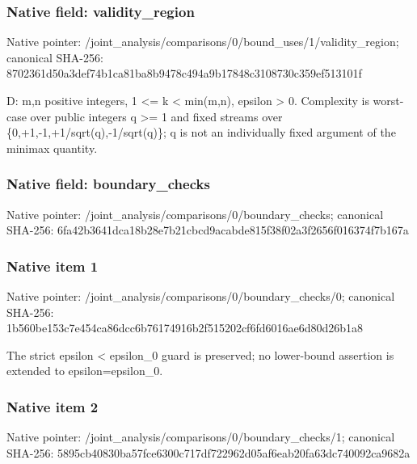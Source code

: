 \documentclass[10pt,a4paper]{article}
\begin{document}
\subsubsection{Native field: validity\_\allowbreak{}region}
Native pointer: /joint\_\allowbreak{}analysis/comparisons/0/bound\_\allowbreak{}uses/1/validity\_\allowbreak{}region; canonical SHA-256: 8702361d50a3def74b1ca81ba8b9478c494a9b17848c3108730c359ef513101f

\begingroup\raggedright\sloppy D:\allowbreak{} m,\allowbreak{}n positive integers,\allowbreak{} 1 <=\allowbreak{} k < min(m,\allowbreak{}n),\allowbreak{} epsilon > 0. Complexity is worst-case over public integers q >=\allowbreak{} 1 and fixed streams over \{0,\allowbreak{}+1,\allowbreak{}-1,\allowbreak{}+1/\allowbreak{}sqrt(q),\allowbreak{}-1/\allowbreak{}sqrt(q)\};\allowbreak{} q is not an individually fixed argument of the minimax quantity.\par\endgroup

\subsubsection{Native field: boundary\_\allowbreak{}checks}
Native pointer: /joint\_\allowbreak{}analysis/comparisons/0/boundary\_\allowbreak{}checks; canonical SHA-256: 6fa42b3641dca18b28e7b21cbcd9acabde815f38f02a3f2656f016374f7b167a

\subsubsection{Native item 1}
Native pointer: /joint\_\allowbreak{}analysis/comparisons/0/boundary\_\allowbreak{}checks/0; canonical SHA-256: 1b560be153c7e454ca86dcc6b76174916b2f515202cf6fd6016ae6d80d26b1a8

\begingroup\raggedright\sloppy The strict epsilon < epsilon\_\allowbreak{}0 guard is preserved;\allowbreak{} no lower-bound assertion is extended to epsilon=\allowbreak{}epsilon\_\allowbreak{}0.\par\endgroup

\subsubsection{Native item 2}
Native pointer: /joint\_\allowbreak{}analysis/comparisons/0/boundary\_\allowbreak{}checks/1; canonical SHA-256: 5895cb40830ba57fce6300c717df722962d05af6eab20fa63dc740092ca9682a
\end{document}
